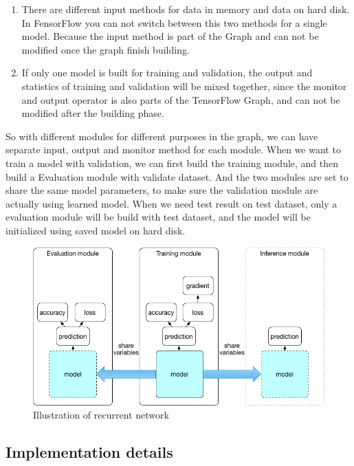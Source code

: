 \begin{enumerate}
   \item There are different input methods for data in memory and data on hard disk. In FensorFlow you can not switch between this two methods for a single model. Because the input method is part of the Graph and can not be modified once the graph finish building.
   \item If only one model is built for training and validation, the output and statistics of training and validation will be mixed together, since the monitor and output operator is also parts of the TensorFlow Graph, and can not be modified after the building phase. 
   
\end{enumerate}
So with different modules for different purposes in the graph, we can have separate input, output and monitor method for each module. When we want to train a model with validation, we can first build the training module, and then build a Evaluation module with validate dataset. And the two modules are set to share the same model parameters, to make sure the validation module are actually using learned model. When we need test result on test dataset, only a evaluation module will be build with test dataset, and the model will be initialized using saved model on hard disk.
\begin{figure}[H] 
	\centering
	\includegraphics[width=5in]{Figures/system_detail}
	\caption[Detail inside recurrent unit]{Illustration of recurrent network}
	\label{fig:system_detail}
\end{figure}

\subsection{Implementation details}
